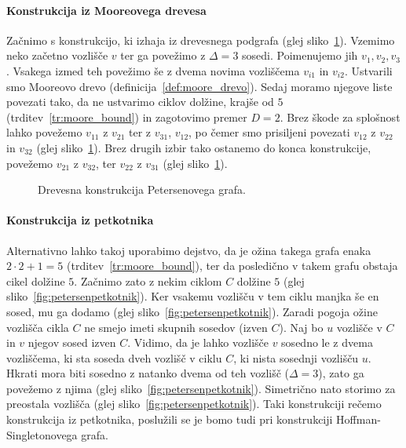 \documentclass[fin1, tisk]{fmfdelo}
\begin{document}
\paragraph{Konstrukcija iz Mooreovega drevesa}
Začnimo s konstrukcijo, ki izhaja iz drevesnega podgrafa (glej sliko~\ref{fig:petersendrevo}). 
Vzemimo neko začetno vozlišče $v$ ter ga povežimo z $\Delta=3$ sosedi. Poimenujemo jih $v_1, v_2, v_3$.
Vsakega izmed teh povežimo še z dvema novima vozliščema $v_{i1}$ in $v_{i2}$. 
Ustvarili smo Mooreovo drevo (definicija~\ref{def:moore_drevo}). Sedaj moramo
njegove liste povezati tako, da ne ustvarimo ciklov dolžine, krajše od $5$ (trditev~\ref{tr:moore_bound})
in zagotovimo premer $D=2$. 
Brez škode za splošnost lahko 
povežemo $v_{11}$ z $v_{21}$ ter z $v_{31}$, $v_{12}$, po čemer smo prisiljeni povezati $v_{12}$ z 
$v_{22}$ in $v_{32}$ (glej sliko~\ref{fig:petersendrevo}). Brez drugih izbir tako ostanemo do konca konstrukcije, povežemo $v_{21}$ z
$v_{32}$, ter $v_{22}$ z $v_{31}$ (glej sliko~\ref{fig:petersendrevo}).

\begin{figure}[H]
    \centering
    \def\svgwidth{\columnwidth}
    \caption{Drevesna konstrukcija Petersenovega grafa.}
    \label{fig:petersendrevo}
\end{figure}

\paragraph{Konstrukcija iz petkotnika}
Alternativno lahko takoj uporabimo dejstvo, da je ožina takega grafa enaka $2\cdot 2 + 1 = 5$ (trditev~\ref{tr:moore_bound}), ter
da posledično v takem grafu obstaja
cikel dolžine $5$. Začnimo zato z nekim ciklom $C$ dolžine $5$ (glej sliko~\ref{fig:petersenpetkotnik}). Ker vsakemu vozlišču v tem ciklu manjka še en sosed, mu ga dodamo (glej sliko~\ref{fig:petersenpetkotnik}).
Zaradi pogoja ožine vozlišča cikla $C$ ne smejo imeti skupnih sosedov (izven $C$).
Naj bo $u$ vozlišče v $C$ in $v$ njegov sosed izven $C$.
Vidimo, da je lahko vozlišče $v$ sosedno le z dvema vozliščema, ki sta soseda dveh
vozlišč v ciklu $C$, ki nista sosednji vozlišču $u$. Hkrati mora biti sosedno z natanko dvema od teh vozlišč ($\Delta=3$), zato ga povežemo z njima (glej sliko~\ref{fig:petersenpetkotnik}). Simetrično nato storimo 
za preostala vozlišča (glej sliko~\ref{fig:petersenpetkotnik}). Taki konstrukciji
rečemo konstrukcija iz petkotnika, poslužili se je bomo tudi pri konstrukciji Hoffman-Singletonovega grafa.
\end{document}
